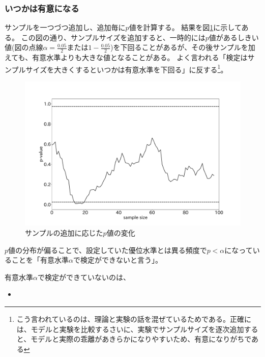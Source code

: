 \subsubsection{いつかは有意になる}
サンプルを一つづつ追加し、追加毎に$p$値を計算する。
結果を図\ref{fig:time_series_p_value}に示してある。
この図の通り、サンプルサイズを追加すると、一時的には$p$値があるしきい値(図の点線$\alpha=\frac{0.05}{2}$または$1-\frac{0.05}{2}$)を下回ることがあるが、その後サンプルを加えても、有意水準よりも大きな値となることがある。
よく言われる「検定はサンプルサイズを大きくするといつかは有意水準を下回る」に反する\footnote{こう言われているのは、理論と実験の話を混ぜているためである。正確には、モデルと実験を比較するさいに、実験でサンプルサイズを逐次追加すると、モデルと実際の乖離があきらかになりやすいため、有意になりがちである}。

\begin{figure}
  \begin{center}
    \includegraphics[width=15cm]{./image/04_/recurssive_test.pdf}
    \caption{サンプルの追加に応じた$p$値の変化}
        \label{fig:time_series_p_value}
    \end{center}
\end{figure}




\begin{defi}
  $p$値の分布が偏ることで、設定していた優位水準とは異る頻度で$p<\alpha$になっていることを「有意水準$\alpha$で検定ができないと言う」。
\end{defi}

有意水準$\alpha$で検定ができていないのは、
\begin{itemize}
  \item 
\end{itemize}
\fi

